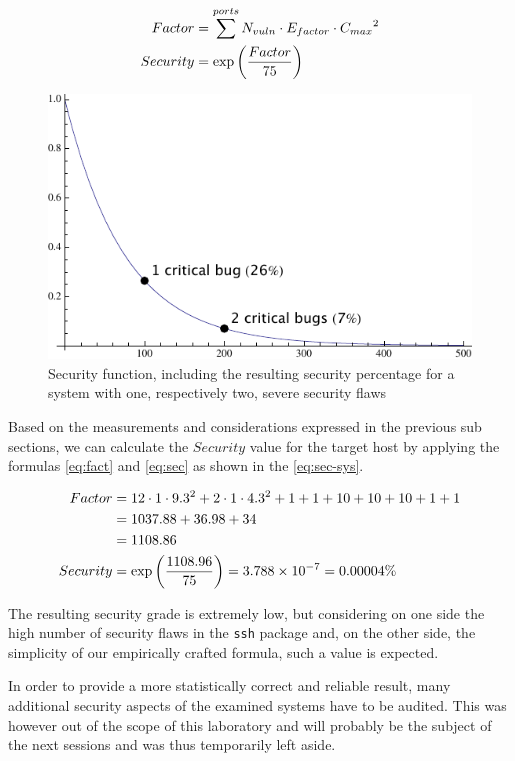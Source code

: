 \documentclass[10pt,a4paper,twoside,onecolumn]{article}
\begin{document}
\vspace{-.5cm}
\begin{align}
	\label{eq:fact}
Factor &= \sum\limits^{ports}{N_{vuln} \cdot E_{factor} \cdot {C_{max}}^2}\\
	\label{eq:sec}
   Security &= \exp\left({Factor \over 75}\right)
\end{align}

\begin{figure}[ht]
	\centering
	\includegraphics[width=.6\textwidth]{images/sec-plot}
	\caption{Security function, including the resulting security percentage for a system with one, respectively two, severe security flaws}
	\label{fig:sec-plot}
\end{figure}

Based on the measurements and considerations expressed in the previous sub sections, we can calculate the $Security$ value for the target host by applying the formulas \ref{eq:fact} and \ref{eq:sec} as shown in the \autoref{eq:sec-sys}.

\vspace{-.5cm}
\begin{align}
	Factor &= 12 \cdot 1 \cdot 9.3^2 + 2 \cdot 1 \cdot 4.3^2 + 1 + 1 + 10 + 10 + 10 + 1 + 1 \nonumber\\
			 &= 1037.88 + 36.98 + 34 \nonumber\\
			 &= 1108.86\nonumber\\
	\label{eq:sec-sys}
	Security &= \exp\left({1108.96\over75}\right) = 3.788 \times 10^{-7} = 0.00004\%
\end{align}

The resulting security grade is extremely low, but considering on one side the high number of security flaws in the \texttt{ssh} package and, on the other side, the simplicity of our empirically crafted formula, such a value is expected.

In order to provide a more statistically correct and reliable result, many additional security aspects of the examined systems have to be audited. This was however out of the scope of this laboratory and will probably be the subject of the next sessions and was thus temporarily left aside.
\end{document}
